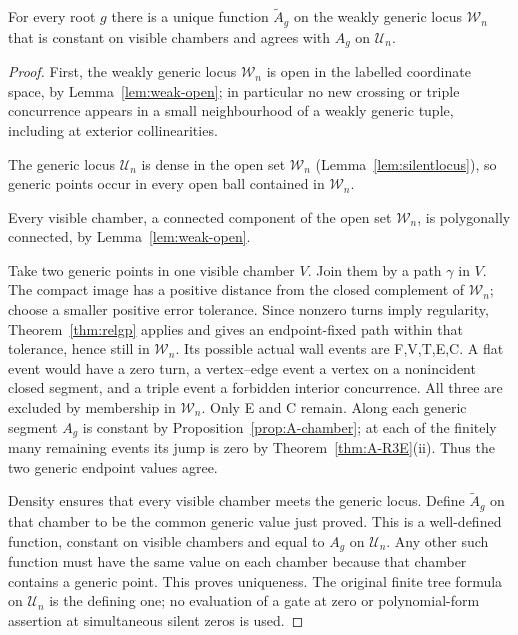 \begin{theorem}\label{thm:A-continuation}
For every root $g$ there is a unique function $\widetilde A_g$ on the weakly
generic locus $\mathcal W_n$ that is constant on visible chambers and agrees
with $A_g$ on $\mathcal U_n$.
\end{theorem}
\begin{proof}
First, the weakly generic locus $\mathcal W_n$ is open in the labelled
coordinate space, by Lemma~\ref{lem:weak-open}; in particular no new
crossing or triple concurrence appears in a small neighbourhood of a weakly
generic tuple, including at exterior collinearities.

The generic locus $\mathcal U_n$ is dense in the open set $\mathcal W_n$
(Lemma~\ref{lem:silentlocus}), so generic points occur in every open ball
contained in $\mathcal W_n$.

Every visible chamber, a connected component of the open set
$\mathcal W_n$, is polygonally connected, by Lemma~\ref{lem:weak-open}.

Take two generic points in one visible chamber $V$. Join them by a path
$\gamma$ in $V$. The compact image has a positive distance from the closed
complement of $\mathcal W_n$; choose a smaller positive error tolerance.
Since nonzero turns imply regularity, Theorem~\ref{thm:relgp} applies and
gives an endpoint-fixed path within that tolerance, hence still in
$\mathcal W_n$. Its possible actual wall events are F,V,T,E,C.
A flat event would have a zero turn, a vertex--edge event a vertex on a
nonincident closed segment, and a triple event a forbidden interior
concurrence. All three are excluded by membership in $\mathcal W_n$.
Only E and C remain. Along each generic segment $A_g$ is constant by
Proposition~\ref{prop:A-chamber}; at each of the finitely many remaining
events its jump is zero by Theorem~\ref{thm:A-R3E}(ii). Thus the two
generic endpoint values agree.

Density ensures that every visible chamber meets the generic locus.
Define $\widetilde A_g$ on that chamber to be the common generic value
just proved. This is a well-defined function, constant on visible chambers
and equal to $A_g$ on $\mathcal U_n$. Any other such function must have
the same value on each chamber because that chamber contains a generic
point. This proves uniqueness. The original finite tree formula on
$\mathcal U_n$ is the defining one; no evaluation of a gate at zero or
polynomial-form assertion at simultaneous silent zeros is used.
\end{proof}

